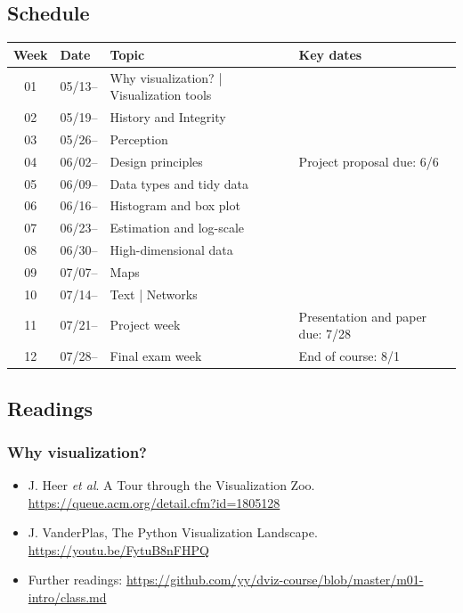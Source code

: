 \subsection{Schedule}\label{sub:schedule}%

\begin{tabular}{@{}clll@{}} \toprule
  Week & Date   & Topic & Key dates \\\midrule
  01 & 05/13--  & Why visualization? | Visualization tools &  \\
  02 & 05/19--  & History and Integrity &  \\
  03 & 05/26--  & Perception &  \\
  04 & 06/02--  & Design principles & Project proposal due: 6/6 \\
  05 & 06/09--  & Data types and tidy data &  \\
  06 & 06/16--  & Histogram and box plot &  \\
  07 & 06/23--  & Estimation and log-scale &  \\
  08 & 06/30--  & High-dimensional data  &  \\
  09 & 07/07--  & Maps &  \\
  10 & 07/14--  & Text | Networks &  \\
  11 & 07/21--  & Project week & Presentation and paper due: 7/28 \\
  12 & 07/28--  & Final exam week & End of course: 8/1 \\
  \bottomrule
\end{tabular}



\subsection{Readings}\label{sub:schedule}%

\subsubsection{Why visualization?} %

\begin{itemize}\itemsep0em 
\item J. Heer \emph{et al}. A Tour through the Visualization Zoo. \url{https://queue.acm.org/detail.cfm?id=1805128}
\item J. VanderPlas, The Python Visualization Landscape. \url{https://youtu.be/FytuB8nFHPQ}
\item Further readings: \url{https://github.com/yy/dviz-course/blob/master/m01-intro/class.md}
\end{itemize}	

